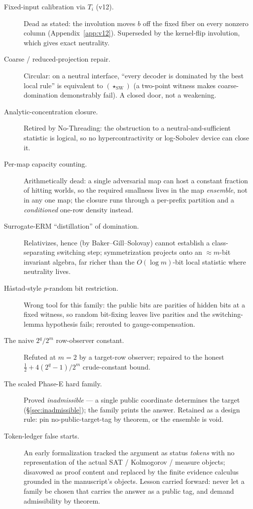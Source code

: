 \documentclass[11pt]{article}
\theoremstyle{definition}
\newcommand{\StarSW}{(\star_{\mathrm{SW}})}
\begin{document}
\begin{description}
  \item[Fixed-input calibration via $T_i$ (v12).] Dead as stated: the involution
        moves $b$ off the fixed fiber on every nonzero column
        (Appendix~\ref{app:v12}). Superseded by the kernel-flip involution, which
        gives exact neutrality.
  \item[Coarse / reduced-projection repair.] Circular: on a neutral interface,
        ``every decoder is dominated by the best local rule'' is equivalent to
        $\StarSW$ (a two-point witness makes coarse-domination demonstrably fail).
        A closed door, not a weakening.
  \item[Analytic-concentration closure.] Retired by No-Threading: the obstruction
        to a neutral-and-sufficient statistic is logical, so no hypercontractivity
        or log-Sobolev device can close it.
  \item[Per-map capacity counting.] Arithmetically dead: a single adversarial map
        can host a constant fraction of hitting worlds, so the required smallness
        lives in the map \emph{ensemble}, not in any one map; the closure runs
        through a per-prefix partition and a \emph{conditioned} one-row density
        instead.
  \item[Surrogate-ERM ``distillation'' of domination.] Relativizes, hence (by
        Baker--Gill--Solovay) cannot establish a class-separating switching step;
        symmetrization projects onto an $\approx m$-bit invariant algebra, far
        richer than the $O(\log m)$-bit local statistic where neutrality lives.
  \item[H{\aa}stad-style $p$-random bit restriction.] Wrong tool for this family:
        the public bits are parities of hidden bits at a fixed witness, so random
        bit-fixing leaves live parities and the switching-lemma hypothesis fails;
        rerouted to gauge-compensation.
  \item[The naive $2^q/2^m$ row-observer constant.] Refuted at $m=2$ by a
        target-row observer; repaired to the honest
        $\tfrac12+4(2^q-1)/2^m$ crude-constant bound.
  \item[The scaled Phase-E hard family.] Proved \emph{inadmissible} --- a single
        public coordinate determines the target (\S\ref{sec:inadmissible}); the
        family prints the answer. Retained as a design rule: pin no-public-target-tag
        by theorem, or the ensemble is void.
  \item[Token-ledger false starts.] An early formalization tracked the argument as
        status \emph{tokens} with no representation of the actual SAT / Kolmogorov
        / measure objects; disavowed as proof content and replaced by the finite
        evidence calculus grounded in the manuscript's objects. Lesson carried
        forward: never let a family be chosen that carries the answer as a public
        tag, and demand admissibility by theorem.
\end{description}
\end{document}
